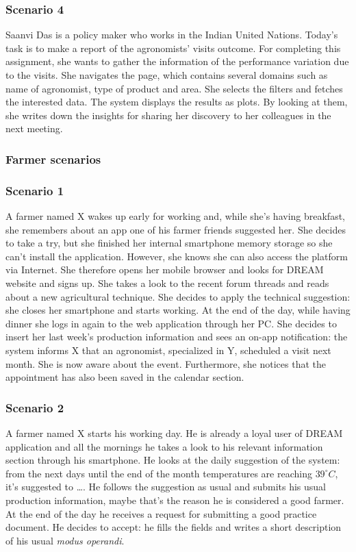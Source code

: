 \subsubsection*{Scenario 4}
Saanvi Das is a policy maker who works in the Indian United Nations. Today's task is to make a report of the agronomists' visits outcome. For completing this assignment, she wants to gather the information of the performance variation due to the visits. She navigates the page, which contains several domains such as name of agronomist, type of product and area. She selects the filters and fetches the interested data. The system displays the results as plots. By looking at them, she writes down the insights for sharing her discovery to her colleagues in the next meeting.  

\subsubsection{Farmer scenarios}

\subsubsection*{Scenario 1}
A farmer named X wakes up early for working and, while she's having breakfast, she remembers about an app one of his farmer friends suggested her. She decides to take a try, but she finished her internal smartphone memory storage so she can't install the application. However, she knows she can also access the platform via Internet. She therefore opens her mobile browser and looks for DREAM website and signs up. She takes a look to the recent forum threads and reads about a new agricultural technique. She decides to apply the technical suggestion: she closes her smartphone and starts working. At the end of the day, while having dinner she logs in again to the web application through her PC. She decides to insert her last week's production information and sees an on-app notification: the system informs X that an agronomist, specialized in Y, scheduled a visit next month. She is now aware about the event. Furthermore, she notices that the appointment has also been saved in the calendar section.

\subsubsection*{Scenario 2}
A farmer named X starts his working day. He is already a loyal user of DREAM application and all the mornings he takes a look to his relevant information section through his smartphone. He looks at the daily suggestion of the system: from the next days until the end of the month temperatures are reaching $39^\circ C$, it's suggested to \ldots. He follows the suggestion as usual and submits his usual production information, maybe that's the reason he is considered a good farmer. At the end of the day he receives a request for submitting a good practice document. He decides to accept: he fills the fields and writes a short description of his usual \textit{modus operandi}.

